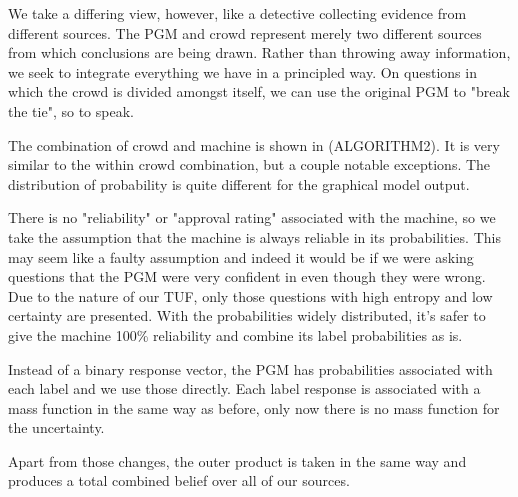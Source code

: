 We take a differing view, however, like a detective collecting evidence from different sources.  The PGM and crowd represent merely two different sources from which conclusions are being drawn.  Rather than throwing away information, we seek to integrate everything we have in a principled way.  On questions in which the crowd is divided amongst itself, we can use the original PGM to "break the tie", so to speak.

The combination of crowd and machine is shown in (ALGORITHM2).  It is very similar to the within crowd combination, but a couple notable exceptions.  The distribution of probability is quite different for the graphical model output.  

There is no "reliability" or "approval rating" associated with the machine, so we take the assumption that the machine is always reliable in its probabilities.  This may seem like a faulty assumption and indeed it would be if we were asking questions that the PGM were very confident in even though they were wrong.  Due to the nature of our TUF, only those questions with high entropy and low certainty are presented.  With the probabilities widely distributed, it's safer to give the machine 100\% reliability and combine its label probabilities as is.

Instead of a binary response vector, the PGM has probabilities associated with each label and we use those directly.  Each label response is associated with a mass function in the same way as before, only now there is no mass function for the uncertainty.

Apart from those changes, the outer product is taken in the same way and produces a total combined belief over all of our sources.
